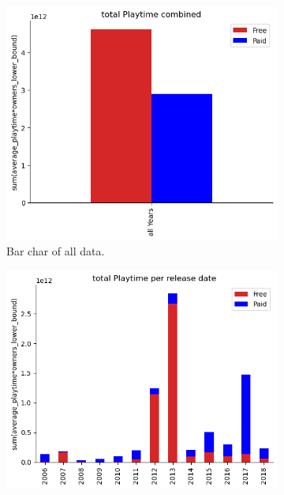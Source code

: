 \documentclass[11pt]{article}
\begin{document}
\begin{figure}
    \centering
    \begin{subfigure}[b]{0.475\textwidth}
        \centering
        \includegraphics[width=1\textwidth]{graphics/insight1_graph1.png}
        \caption{Bar char of all data.}
        \label{fig:insight1_1}
    \end{subfigure}
    \hfill
    \begin{subfigure}[b]{0.475\textwidth}
        \centering
        \includegraphics[width=1\textwidth]{graphics/insight1_graph2.png}

\end{subfigure}
\end{figure}
\end{document}
